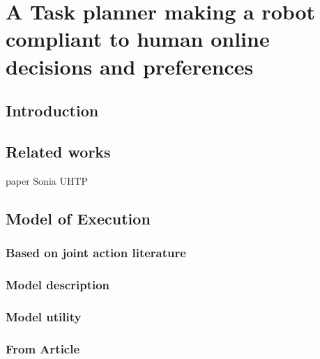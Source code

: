 \ifdefined{}
\else
\setcounter{chapter}{3} %
\dominitoc
\faketableofcontents
\fi

\chapter{A Task planner making a robot compliant to human online decisions and preferences}
\label{chap:4}
\minitoc


\section{Introduction}

\section{Related works}
paper Sonia UHTP



\section{Model of Execution}

    \subsection{Based on joint action literature}

    \subsection{Model description}

    \subsection{Model utility}

    \subsection{From Article}

